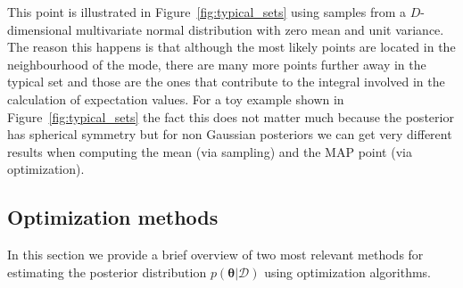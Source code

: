 \documentclass[12pt,dvipsnames]{report}
\renewcommand{\vec}[1]{\boldsymbol{\mathbf{#1}}}
\begin{document}
This point is illustrated in Figure~\ref{fig:typical_sets} using samples from 
a $D$-dimensional multivariate normal distribution with zero mean and unit 
variance. 
The reason this happens is that  although the most likely points are located 
in the neighbourhood of the mode, 
there are many more points further away in the typical set and those are the 
ones that contribute to the integral involved in the calculation of expectation 
values.
For a toy example shown in Figure~\ref{fig:typical_sets} the fact this does not 
matter much because the posterior has spherical symmetry but  for non Gaussian
posteriors we can get very different results  when computing the mean (via 
sampling) and the MAP point (via optimization).


\subsection{Optimization methods}
In this section we provide a brief overview of two most relevant methods for
estimating the posterior distribution $p(\vec{\theta}\lvert \mathcal{D})$ using
optimization algorithms.
\end{document}
